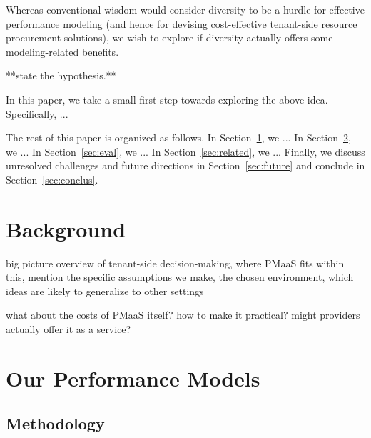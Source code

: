 \documentclass{acm_proc_article-sp}
\begin{document}
{%
Whereas conventional wisdom would consider diversity to be a hurdle for effective performance modeling (and hence for devising cost-effective tenant-side resource procurement solutions), we wish to explore if diversity actually offers some modeling-related benefits. 

 **state the hypothesis.** 

 In this paper, we take a small first step towards exploring the above idea. Specifically, ... 

The rest of this paper is organized as follows. In Section~\ref{sec:back}, we ... In Section~\ref{sec:model}, we ... In Section~\ref{sec:eval}, we ... In Section~\ref{sec:related}, we ... Finally, we discuss unresolved challenges and future directions in Section~\ref{sec:future} and conclude in Section~\ref{sec:conclus}. 

}



 


\section{Background}
\label{sec:back}

big picture overview of tenant-side decision-making, where PMaaS fits within this, mention the specific assumptions we make, the chosen environment, which ideas are likely to generalize to other settings
 
what about the costs of PMaaS itself? how to make it practical? might providers actually offer it as a service?

\section{Our Performance Models}
\label{sec:model}

\subsection{Methodology}
\end{document}
